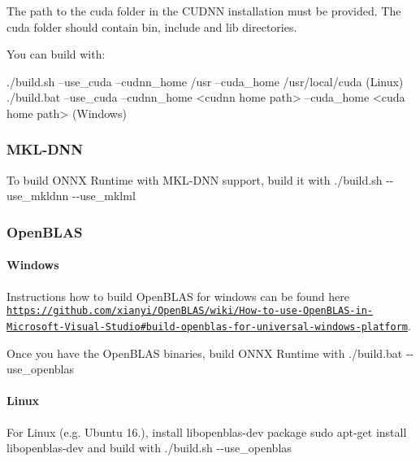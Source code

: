 The path to the \textquotesingle{}cuda\textquotesingle{} folder in the C\+U\+D\+NN installation must be provided. The \textquotesingle{}cuda\textquotesingle{} folder should contain \textquotesingle{}bin\textquotesingle{}, \textquotesingle{}include\textquotesingle{} and \textquotesingle{}lib\textquotesingle{} directories.

You can build with\+:


\begin{DoxyCode}
./build.sh --use\_cuda --cudnn\_home /usr --cuda\_home /usr/local/cuda (Linux)
./build.bat --use\_cuda --cudnn\_home <cudnn home path> --cuda\_home <cuda home path> (Windows)
\end{DoxyCode}


\subsubsection*{M\+K\+L-\/\+D\+NN}

To build O\+N\+NX Runtime with M\+K\+L-\/\+D\+NN support, build it with {\ttfamily ./build.sh -\/-\/use\+\_\+mkldnn -\/-\/use\+\_\+mklml}

\subsubsection*{Open\+B\+L\+AS}

\paragraph*{Windows}

Instructions how to build Open\+B\+L\+AS for windows can be found here \href{https://github.com/xianyi/OpenBLAS/wiki/How-to-use-OpenBLAS-in-Microsoft-Visual-Studio#build-openblas-for-universal-windows-platform}{\tt https\+://github.\+com/xianyi/\+Open\+B\+L\+A\+S/wiki/\+How-\/to-\/use-\/\+Open\+B\+L\+A\+S-\/in-\/\+Microsoft-\/\+Visual-\/\+Studio\#build-\/openblas-\/for-\/universal-\/windows-\/platform}.

Once you have the Open\+B\+L\+AS binaries, build O\+N\+NX Runtime with {\ttfamily ./build.bat -\/-\/use\+\_\+openblas}

\paragraph*{Linux}

For Linux (e.\+g. Ubuntu 16.), install libopenblas-\/dev package {\ttfamily sudo apt-\/get install libopenblas-\/dev} and build with {\ttfamily ./build.sh -\/-\/use\+\_\+openblas}

